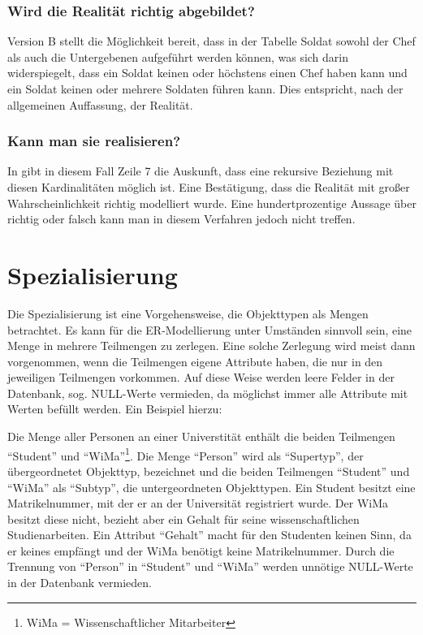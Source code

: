           \subsubsection{Wird die Realit\"at richtig abgebildet?}
            Version B stellt die M\"oglichkeit bereit, dass in der Tabelle Soldat sowohl der Chef als auch die Untergebenen aufgef\"uhrt werden k\"onnen, was sich darin widerspiegelt, dass ein Soldat keinen oder h\"ochstens einen Chef haben kann und ein Soldat keinen oder mehrere Soldaten f\"uhren kann. Dies entspricht, nach der allgemeinen Auffassung, der Realit\"at.
          \subsubsection{Kann man sie realisieren?}
            In  gibt in diesem Fall Zeile 7 die Auskunft, dass eine rekursive Beziehung mit diesen Kardinalit\"aten m\"oglich ist. Eine Best\"atigung, dass die Realit\"at mit gro\ss er Wahrscheinlichkeit richtig modelliert wurde. Eine hundertprozentige Aussage \"uber richtig oder falsch kann man in diesem Verfahren jedoch nicht treffen.
    \section{Spezialisierung}
      \label{specialization}
       Die Spezialisierung ist eine Vorgehensweise, die Objekttypen als Mengen
       betrachtet. Es kann f\"ur die ER-Modellierung unter Umst\"anden sinnvoll
       sein, eine Menge in mehrere Teilmengen zu zerlegen. Eine solche Zerlegung
       wird meist dann vorgenommen, wenn die Teilmengen eigene Attribute haben,
       die nur in den jeweiligen Teilmengen vorkommen. Auf diese Weise werden
       leere Felder in der Datenbank, sog. NULL-Werte vermieden, da m\"oglichst
       immer alle Attribute mit Werten bef\"ullt werden. Ein Beispiel hierzu:

       Die Menge aller Personen an einer Universtit\"at enth\"alt die beiden
       Teilmengen \enquote{Student} und \enquote{WiMa}\footnote{WiMa =
       Wissenschaftlicher Mitarbeiter}. Die Menge \enquote{Person} wird als
       \enquote{Supertyp}, der \"ubergeordnetet Objekttyp, bezeichnet und die
       beiden Teilmengen \enquote{Student} und \enquote{WiMa} als
       \enquote{Subtyp}, die untergeordneten Objekttypen.
\clearpage
       Ein Student besitzt eine Matrikelnummer, mit der er an der Universit\"at
       registriert wurde. Der WiMa besitzt diese nicht, bezieht aber ein Gehalt
       f\"ur seine wissenschaftlichen Studienarbeiten. Ein Attribut
       \enquote{Gehalt} macht f\"ur den Studenten keinen Sinn, da er keines
       empf\"angt und der WiMa ben\"otigt keine Matrikelnummer. Durch die
       Trennung von \enquote{Person} in \enquote{Student} und \enquote{WiMa}
       werden unn\"otige NULL-Werte in der Datenbank vermieden.

